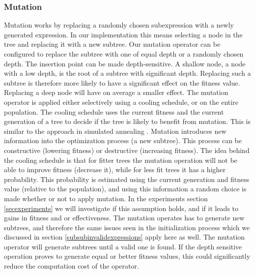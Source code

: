 \subsubsection{Mutation}
Mutation works by replacing a randomly chosen subexpression with a newly generated expression. In our implementation this means selecting a node in the tree and replacing it with a new subtree. Our mutation operator can be configured to replace the subtree with one of equal depth or a randomly chosen depth. The insertion point can be made depth-sensitive. A shallow node, a node with a low depth, is the root of a subtree with significant depth. Replacing such a subtree is therefore more likely to have a significant effect on the fitness value. Replacing a deep node will have on average a smaller effect.
The mutation operator is applied either selectively using a cooling schedule, or on the entire population.
The cooling schedule uses the current fitness and the current generation of a tree to decide if the tree is likely to benefit from mutation. This is similar to the approach in simulated annealing \citep{SA}.
Mutation introduces new information into the optimization process (a new subtree). This process can be constructive (lowering fitness) or destructive (increasing fitness). The idea behind the cooling schedule is that for fitter trees the mutation operation will not be able to improve fitness (decrease it), while for less fit trees it has a higher probability.
This probability is estimated using the current generation and fitness value (relative to the population), and using this information a random choice is made whether or not to apply mutation. In the experiments section \ref{secexperiments} we will investigate if this assumption holds, and if it leads to gains in fitness and or effectiveness.
The mutation operates has to generate new subtrees, and therefore the same issues seen in the initialization process which we discussed in section \ref{subsubinvalidexpressions} apply here as well. The mutation operator will generate subtrees until a valid one is found. If the depth sensitive operation proves to generate equal or better fitness values, this could significantly reduce the computation cost of the operator.

